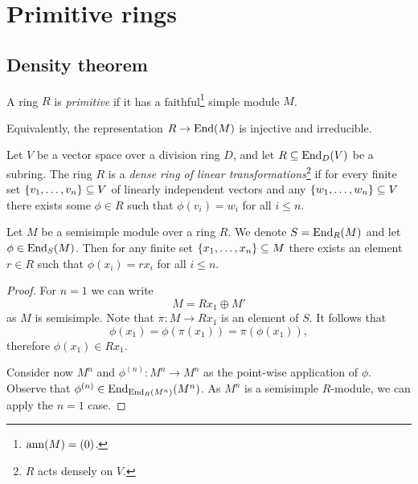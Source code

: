 \section{Primitive rings}

\subsection{Density theorem}


\begin{definicija}
A ring $R$ is \emph{primitive} if it has a
faithful\footnote{$\operatorname{ann}(M) = (0)$.} simple module $M$.
\end{definicija}

\begin{opomba}
Equivalently, the representation $R \to \operatorname{End}(M)$ is injective and
irreducible.
\end{opomba}

\begin{definicija}
Let $V$ be a vector space over a division ring $D$, and let
$R \subseteq \operatorname{End}_D(V)$ be a subring. The ring $R$ is a
\emph{dense ring of linear transformations}\footnote{$R$ acts densely on $V$.}
if for every finite set $\left\{v_1, \dots, v_n\right\} \subseteq V$ of
linearly independent vectors and any
$\left\{w_1, \dots, w_n\right\} \subseteq V$ there exists some $\phi \in R$
such that $\phi(v_i) = w_i$ for all $i \leq n$.
\end{definicija}

\begin{izrek}[Density]
Let $M$ be a semisimple module over a ring $R$. We denote
$S = \operatorname{End}_R(M)$ and let $\phi \in \operatorname{End}_S(M)$. Then for any finite
set $\left\{x_1, \dots, x_n\right\} \subseteq M$ there exists an element
$r \in R$ such that $\phi(x_i) = r x_i$ for all $i \leq n$.
\end{izrek}

\begin{proof}
For $n = 1$ we can write
\[
M = R x_1 \oplus M'
\]
as $M$ is semisimple. Note that $\pi \colon M \to R x_1$ is an
element of $S$. It follows that
\[
\phi(x_1) = \phi(\pi(x_1)) = \pi(\phi(x_1)),
\]
therefore $\phi(x_1) \in R x_1$.

Consider now $M^n$ and $\phi^{(n)} \colon M^n \to M^n$ as the
point-wise application of $\phi$. Observe that
$\phi^{(n)} \in \operatorname{End}_{\operatorname{End}_R(M^n)}(M^n)$. As $M^n$ is a semisimple
$R$-module, we can apply the $n=1$ case.
\end{proof}


